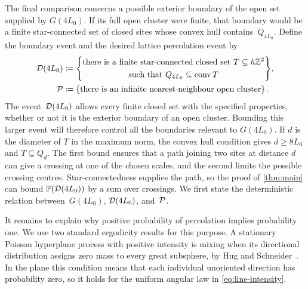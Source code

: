 \documentclass[11pt,letterpaper]{article}
\begin{document}
The final comparison concerns a possible exterior boundary of the open set supplied by $G(4L_0)$. If its full open cluster were finite, that boundary would be a finite star-connected set of closed sites whose convex hull contains~$Q_{4L_0}$. Define the boundary event and the desired lattice percolation event by
\begin{equation}\label{eq:boundary-percolation-events}
  \begin{aligned}
    \mathcal D(4L_0)&\coloneqq\Bigg\{
      \begin{gathered}
        \text{there is a finite star-connected closed set}\ T\subseteq h\mathbb Z^2\\
        \text{such that }Q_{4L_0}\subseteq\operatorname{conv} T
      \end{gathered}
    \Bigg\},\\
    \mathcal P&\coloneqq\{\text{there is an infinite nearest-neighbour open cluster}\}\,.
  \end{aligned}
\end{equation}
The event~$\mathcal D(4L_0)$ allows every finite closed set with the specified properties, whether or not it is the exterior boundary of an open cluster. Bounding this larger event will therefore control all the boundaries relevant to $G(4L_0)$. If $d$ is the diameter of $T$ in the maximum norm, the convex hull condition gives $d\ge8L_0$ and $T\subseteq Q_d$. The first bound ensures that a path joining two sites at distance $d$ can give a crossing at one of the chosen scales, and the second limits the possible crossing centres. Star-connectedness supplies the path, so the proof of \cref{thm:main} can bound $\mathbb P(\mathcal D(4L_0))$ by a sum over crossings. We first state the deterministic relation between~$G(4L_0)$, $\mathcal D(4L_0)$, and~$\mathcal P$.


It remains to explain why positive probability of percolation implies probability one. We use two standard ergodicity results for this purpose. A stationary Poisson hyperplane process with positive intensity is mixing when its directional distribution assigns zero mass to every great subsphere, by Hug and Schneider~\cite[Theorem~7.1.4]{HS24}. In the plane this condition means that each individual unoriented direction has probability zero, so it holds for the uniform angular law in \eqref{eq:line-intensity}.
\end{document}
